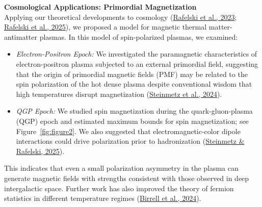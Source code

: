 \documentclass[11pt]{article}
\begin{document}
\vspace{1em}

{\noindent\Large\textbf{Cosmological Applications: Primordial Magnetization}}\\
Applying our theoretical developments to cosmology (\href{https://doi.org/10.3390/universe9070309}{Rafelski et al., 2023}; \href{https://doi.org/10.48550/arXiv.2409.19031}{Rafelski et al., 2025}), we proposed a model for magnetic thermal matter-antimatter plasmas. In this model of spin-polarized plasmas, we examined:
\begin{itemize}[leftmargin=1.5em,nosep]
    \item \emph{Electron-Positron Epoch:} We investigated the paramagnetic characteristics of electron-positron plasma subjected to an external primordial field, suggesting that the origin of primordial magnetic fields (PMF) may be related to the spin polarization of the hot dense plasma despite conventional wisdom that high temperatures disrupt magnetization (\href{https://doi.org/10.1103/PhysRevD.108.123522}{Steinmetz et al., 2024}).
    \item \emph{QGP Epoch:} We studied spin magnetization during the quark-gluon-plasma (QGP) epoch and estimated maximum bounds for spin magnetization; see Figure~\ref{fig:figure2}. We also suggested that electromagnetic-color dipole interactions could drive polarization prior to hadronization (\href{https://doi.org/10.1140/epjs/s11734-025-01625-9}{Steinmetz \& Rafelski, 2025}).
\end{itemize}
This indicates that even a small polarization asymmetry in the plasma can generate magnetic fields with strengths consistent with those observed in deep intergalactic space. Further work has also improved the theory of fermion statistics in different temperature regimes (\href{https://doi.org/10.1007/s10773-024-05695-8}{Birrell et al., 2024}).

\vspace{1em}
\end{document}
